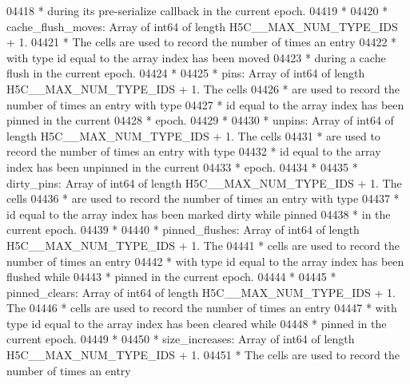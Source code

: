 \begin{DoxyCode}
04418 \textcolor{comment}{ *      during its pre-serialize callback in the current epoch.}
04419 \textcolor{comment}{ *}
04420 \textcolor{comment}{ * cache\_flush\_moves: Array of int64 of length H5C\_\_MAX\_NUM\_TYPE\_IDS + 1. }
04421 \textcolor{comment}{ *      The cells are used to record the number of times an entry}
04422 \textcolor{comment}{ *      with type id equal to the array index has been moved}
04423 \textcolor{comment}{ *      during a cache flush in the current epoch.}
04424 \textcolor{comment}{ *}
04425 \textcolor{comment}{ * pins:        Array of int64 of length H5C\_\_MAX\_NUM\_TYPE\_IDS + 1.  The cells}
04426 \textcolor{comment}{ *      are used to record the number of times an entry with type}
04427 \textcolor{comment}{ *      id equal to the array index has been pinned in the current}
04428 \textcolor{comment}{ *      epoch.}
04429 \textcolor{comment}{ *}
04430 \textcolor{comment}{ * unpins:      Array of int64 of length H5C\_\_MAX\_NUM\_TYPE\_IDS + 1.  The cells}
04431 \textcolor{comment}{ *      are used to record the number of times an entry with type}
04432 \textcolor{comment}{ *      id equal to the array index has been unpinned in the current}
04433 \textcolor{comment}{ *      epoch.}
04434 \textcolor{comment}{ *}
04435 \textcolor{comment}{ * dirty\_pins:  Array of int64 of length H5C\_\_MAX\_NUM\_TYPE\_IDS + 1.  The cells}
04436 \textcolor{comment}{ *      are used to record the number of times an entry with type}
04437 \textcolor{comment}{ *      id equal to the array index has been marked dirty while pinned}
04438 \textcolor{comment}{ *      in the current epoch.}
04439 \textcolor{comment}{ *}
04440 \textcolor{comment}{ * pinned\_flushes:  Array of int64 of length H5C\_\_MAX\_NUM\_TYPE\_IDS + 1.  The}
04441 \textcolor{comment}{ *      cells are used to record the number of times an  entry}
04442 \textcolor{comment}{ *      with type id equal to the array index has been flushed while}
04443 \textcolor{comment}{ *      pinned in the current epoch.}
04444 \textcolor{comment}{ *}
04445 \textcolor{comment}{ * pinned\_clears:  Array of int64 of length H5C\_\_MAX\_NUM\_TYPE\_IDS + 1.  The}
04446 \textcolor{comment}{ *      cells are used to record the number of times an  entry}
04447 \textcolor{comment}{ *      with type id equal to the array index has been cleared while}
04448 \textcolor{comment}{ *      pinned in the current epoch.}
04449 \textcolor{comment}{ *}
04450 \textcolor{comment}{ * size\_increases:  Array of int64 of length H5C\_\_MAX\_NUM\_TYPE\_IDS + 1.}
04451 \textcolor{comment}{ *      The cells are used to record the number of times an entry}

\end{DoxyCode}
